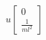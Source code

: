 \documentclass[preview]{standalone}
\begin{document}
\begin{align*}
u\begin{bmatrix}0 \\ \frac{1}{ml^2}\end{bmatrix}
\end{align*}
\end{document}
